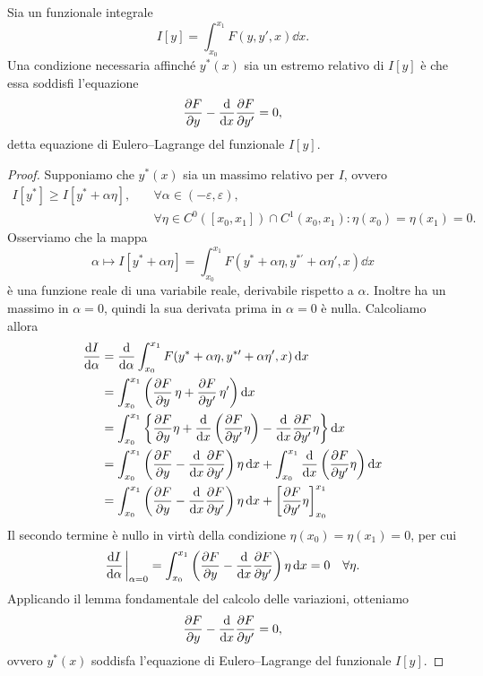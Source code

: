\begin{theorem}[Eulero]
    Sia un funzionale integrale
    \begin{equation*}
        I[y] = \int_{x_0}^{x_1} F(y, y', x)\dd{x}.
    \end{equation*}
    Una condizione necessaria affinché $y^*(x)$ sia un estremo relativo di $I[y]$ è che essa soddisfi l'equazione
    \begin{equation*}
        \pdv{F}{y} - \dv{x}\pdv{F}{y'} = 0,
    \end{equation*}
    detta equazione di Eulero--Lagrange del funzionale $I[y]$.
\end{theorem}
\begin{proof}
    Supponiamo che $y^*(x)$ sia un massimo relativo per $I$, ovvero
    \begin{align*}
        I[y^*] \geq I[y^* + \alpha \eta], \quad
        &\forall \alpha \in (-\varepsilon, \varepsilon), \\
        &\forall \eta \in C^0([x_0, x_1])\cap C^1(x_0, x_1): \eta(x_0) = \eta(x_1) = 0.
    \end{align*}
    Osserviamo che la mappa
    \begin{equation*}
        \alpha \mapsto I[y^* + \alpha \eta] = \int_{x_0}^{x_1} F(y^* + \alpha \eta, y^{*\prime} + \alpha \eta', x)\dd{x}
    \end{equation*}
    è una funzione reale di una variabile reale, derivabile rispetto a $\alpha$. Inoltre ha un massimo in $\alpha = 0$, quindi la sua derivata prima in $\alpha = 0$ è nulla. Calcoliamo allora
    \begin{align*}
        \dv{I}{\alpha} &= \dv{\alpha} \int_{x_0}^{x_1} F(y^* + \alpha \eta, y^{*\prime} + \alpha \eta', x)\dd{x} \\ 
        &= \int_{x_0}^{x_1} \left(\pdv{F}{y}\,\eta + \pdv{F}{y'}\,\eta'\right)\dd{x} \\
        &= \int_{x_0}^{x_1}\left\{ \pdv{F}{y}\eta + \dv{x}\left(\pdv{F}{y'}\eta\right) - \dv{x}\pdv{F}{y'}\eta \right\} \dd{x} \\
        &= \int_{x_0}^{x_1} \left(\pdv{F}{y} - \dv{x}\pdv{F}{y'}\right)\eta\dd{x} + \int_{x_0}^{x_1} \dv{x}\left(\pdv{F}{y'}\eta\right) \dd{x}\\
        &= \int_{x_0}^{x_1} \left(\pdv{F}{y} - \dv{x}\pdv{F}{y'}\right)\eta\dd{x} + \left[\pdv{F}{y'}\eta\right]_{x_0}^{x_1}
    \end{align*}
    Il secondo termine è nullo in virtù della condizione $\eta(x_0) = \eta(x_1) = 0$, per cui
    \begin{equation*}
        \dv{I}{\alpha}\eval_{\alpha=0} = \int_{x_0}^{x_1} \left(\pdv{F}{y} - \dv{x}\pdv{F}{y'}\right)\eta\dd{x} = 0 \quad \forall \eta.
    \end{equation*}
    Applicando il lemma fondamentale del calcolo delle variazioni, otteniamo
    \begin{equation*}
        \pdv{F}{y} - \dv{x}\pdv{F}{y'} = 0,
    \end{equation*}
    ovvero $y^*(x)$ soddisfa l'equazione di Eulero--Lagrange del funzionale $I[y]$.
\end{proof}

